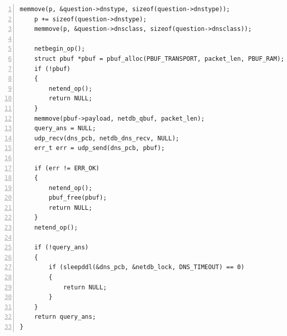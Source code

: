 \documentclass[a4paper,twoside]{ctexrep}
\begin{document}
\begin{spacing}{1.2}
\begin{lstlisting}[numbers=left,style=CppStyle,caption={DNS报文构造},label={code:dnsquery}]
	memmove(p, &question->dnstype, sizeof(question->dnstype));
	p += sizeof(question->dnstype);
	memmove(p, &question->dnsclass, sizeof(question->dnsclass));

	netbegin_op();
	struct pbuf *pbuf = pbuf_alloc(PBUF_TRANSPORT, packet_len, PBUF_RAM);
	if (!pbuf)
	{
		netend_op();
		return NULL;
	}
	memmove(pbuf->payload, netdb_qbuf, packet_len);
	query_ans = NULL;
	udp_recv(dns_pcb, netdb_dns_recv, NULL);
	err_t err = udp_send(dns_pcb, pbuf);

	if (err != ERR_OK)
	{
		netend_op();
		pbuf_free(pbuf);
		return NULL;
	}
	netend_op();

	if (!query_ans)
	{
		if (sleepddl(&dns_pcb, &netdb_lock, DNS_TIMEOUT) == 0)
		{
			return NULL;
		}
	}
	return query_ans;
}
\end{lstlisting}


\end{spacing}
\end{document}
